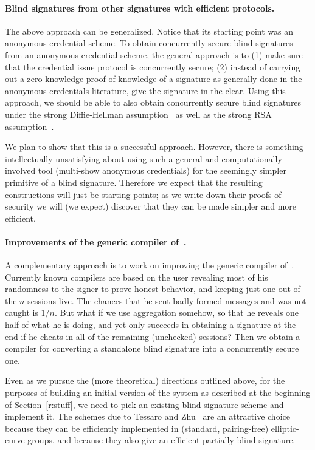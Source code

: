 \paragraph{Blind signatures from other signatures with efficient protocols.}  The above approach can be generalized.  Notice that its starting point was an anonymous credential scheme. To obtain concurrently secure blind signatures from an anonymous credential scheme, the general approach is to (1) make sure that the credential issue protocol is concurrently secure; (2) instead of carrying out a zero-knowledge proof of knowledge of a signature as generally done in the anonymous credentials literature, give the signature in the clear.  Using this approach, we should be able to also obtain concurrently secure blind signatures under the strong Diffie-Hellman assumption~\cite{EPRINT:CamDriLeh16} as well as the strong RSA assumption~\cite{lysyan02a,SCN:CamLys02}.  

We plan to show that this is a successful approach.  However, there is something intellectually unsatisfying about using such a general and computationally involved tool (multi-show anonymous credentials) for the seemingly simpler primitive of a blind signature.  Therefore we expect that the resulting constructions will just be starting points; as we write down their proofs of security we will (we expect) discover that they can be made simpler and more efficient.

\paragraph{Improvements of the generic compiler of~\cite{chllw22}.}  A complementary approach is to work on improving the generic compiler of~\cite{chllw22}.  
Currently known compilers are based on the user revealing most of his randomness to the signer to prove honest behavior, and keeping just one out of the $n$ sessions live.  The chances that he sent badly formed messages and was not caught is $1/n$.  But what if we use aggregation somehow, so that he reveals one half of what he is doing, and yet only succeeds in obtaining a signature at the end if he cheats in all of the remaining (unchecked) sessions? Then we obtain a compiler for converting a standalone blind signature into a concurrently secure one.  

Even as we pursue the (more theoretical) directions outlined above, for the purposes of building an initial version of the system as described at the beginning of Section~\ref{r:stuff}, we need to pick an existing blind signature scheme and implement it. The schemes due to Tessaro and Zhu~\cite{EC:TesZhu22} are an attractive choice because they can be efficiently implemented in (standard, pairing-free) elliptic-curve groups, and because they also give an efficient partially blind signature.


